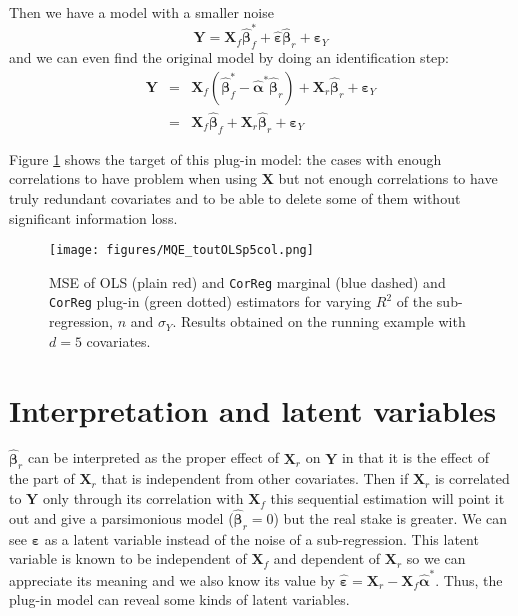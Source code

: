 \documentclass[12pt,a4paper]{report}
\begin{document}
		Then we have a model with a smaller noise
		\begin{equation}
			\boldsymbol{Y}= \boldsymbol{X}_f\hat{\boldsymbol{\beta}}^*_f + \hat{\boldsymbol{\varepsilon}}\hat{\boldsymbol{\beta}}_{r}+\boldsymbol{\varepsilon}_Y 
		\end{equation}
		and we can even find the original model by doing an identification step:
		\begin{eqnarray}
			\boldsymbol{Y}&=& \boldsymbol{X}_f(\hat{\boldsymbol{\beta}}^*_f-\hat{\boldsymbol{\alpha}}^*\hat{\boldsymbol{\beta}}_{r}) + \boldsymbol{X}_r\hat{\boldsymbol{\beta}}_{r}+\boldsymbol{\varepsilon}_Y \\
			&=&\boldsymbol{X}_f\hat{\boldsymbol{\beta}}_f+\boldsymbol{X}_r\hat{\boldsymbol{\beta}}_r+\boldsymbol{\varepsilon}_Y
		\end{eqnarray}
	
	Figure \ref{MQE2} shows the target of this plug-in model: the cases with enough correlations to have problem when using $\boldsymbol{X}$	but not enough correlations to have truly redundant covariates and to be able to delete some of them without significant information loss.
\begin{figure}[h!]
	\texttt{[image: figures/MQE\_toutOLSp5col.png]}
	\caption{MSE of OLS (plain red) and {\tt CorReg} marginal (blue dashed) and {\tt CorReg} plug-in (green dotted) estimators for varying $R^2$ of the sub-regression, $n$ and $\sigma_Y$. Results obtained on the running example with $d=5$ covariates.}\label{MQE2}
\end{figure}	
			
		
	\section{Interpretation and latent variables}
			$\hat{\boldsymbol{\beta}}_{r}$ can be interpreted as the proper effect of $\boldsymbol{X}_r$ on $\boldsymbol{Y}$ in that it is the effect of the part of $\boldsymbol{X}_r$ that is independent from other covariates. Then if $\boldsymbol{X}_r$ is correlated to $\boldsymbol{Y}$ only through its correlation with $\boldsymbol{X}_f$ this sequential estimation will point it out and give a parsimonious model ($\hat{\boldsymbol{\beta}}_r=0$) but the real stake is greater. We can see $\boldsymbol{\varepsilon}$ as a latent variable instead of the noise of a sub-regression. This latent variable is known to be independent of $\boldsymbol{X}_f$ and dependent of $\boldsymbol{X}_r$ so we can appreciate its meaning and we also know its value by $\hat{\boldsymbol{\varepsilon}}=\boldsymbol{X}_r-\boldsymbol{X}_f\hat{\boldsymbol{\alpha}}^*$. Thus, the plug-in model can reveal some kinds of latent variables.
			
\end{document}

